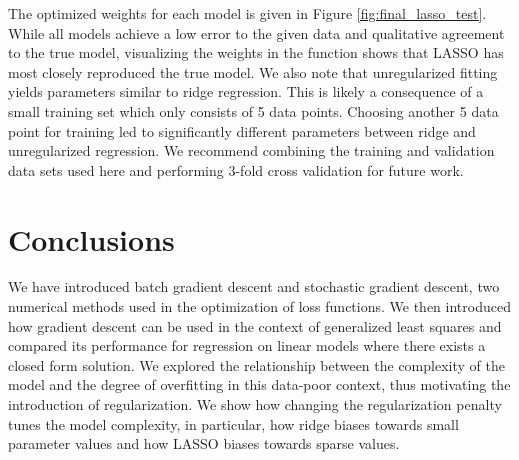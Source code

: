 \documentclass[10pt, twocolumn]{article}
\begin{document}
The optimized weights for each model is given in Figure \ref{fig:final_lasso_test}. While all models achieve a low error to the given data and qualitative agreement to the true model, visualizing the weights in the function shows that LASSO has most closely reproduced the true model. We also note that unregularized fitting yields parameters similar to ridge regression. This is likely a consequence of a small training set which only consists of 5 data points. Choosing another 5 data point for training led to significantly different parameters between ridge and unregularized regression. We recommend combining the training and validation data sets used here and performing 3-fold cross validation for future work.

\section{Conclusions}

We have introduced batch gradient descent and stochastic gradient descent, two numerical methods used in the optimization of loss functions. We then introduced how gradient descent can be used in the context of generalized least squares and compared its performance for regression on linear models where there exists a closed form solution. We explored the relationship between the complexity of the model and the degree of overfitting in this data-poor context, thus motivating the introduction of regularization. We show how changing the regularization penalty tunes the model complexity, in particular, how ridge biases towards small parameter values and how LASSO biases towards sparse values.

 
\end{document}

